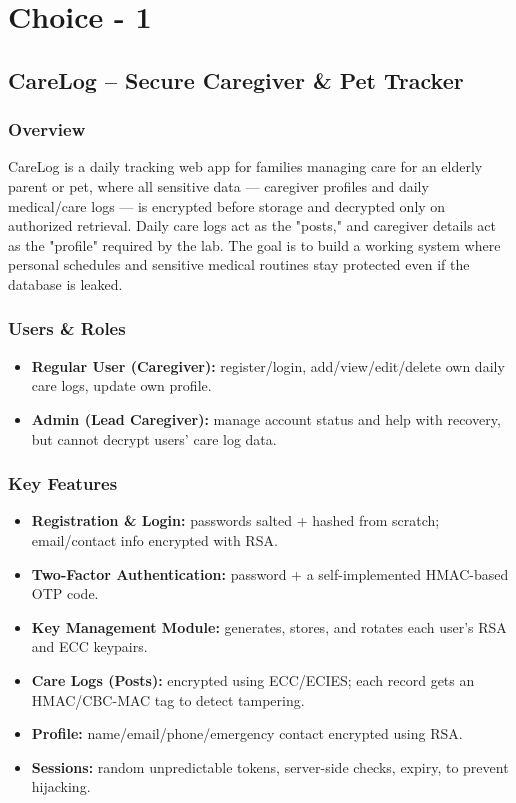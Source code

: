\documentclass{article}
\begin{document}
\section*{Choice - 1}

\subsection*{CareLog -- Secure Caregiver \& Pet Tracker}

\subsubsection*{Overview}
CareLog is a daily tracking web app for families managing care for an elderly parent or pet, where all sensitive data --- caregiver profiles and daily medical/care logs --- is encrypted before storage and decrypted only on authorized retrieval. Daily care logs act as the "posts," and caregiver details act as the "profile" required by the lab. The goal is to build a working system where personal schedules and sensitive medical routines stay protected even if the database is leaked.

\subsubsection*{Users \& Roles}
\begin{itemize}
    \item \textbf{Regular User (Caregiver):} register/login, add/view/edit/delete own daily care logs, update own profile.
    \item \textbf{Admin (Lead Caregiver):} manage account status and help with recovery, but cannot decrypt users' care log data.
\end{itemize}

\subsubsection*{Key Features}
\begin{itemize}
    \item \textbf{Registration \& Login:} passwords salted + hashed from scratch; email/contact info encrypted with RSA.
    \item \textbf{Two-Factor Authentication:} password + a self-implemented HMAC-based OTP code.
    \item \textbf{Key Management Module:} generates, stores, and rotates each user's RSA and ECC keypairs.
    \item \textbf{Care Logs (Posts):} encrypted using ECC/ECIES; each record gets an HMAC/CBC-MAC tag to detect tampering.
    \item \textbf{Profile:} name/email/phone/emergency contact encrypted using RSA.
    \item \textbf{Sessions:} random unpredictable tokens, server-side checks, expiry, to prevent hijacking.
\end{itemize}
\end{document}
